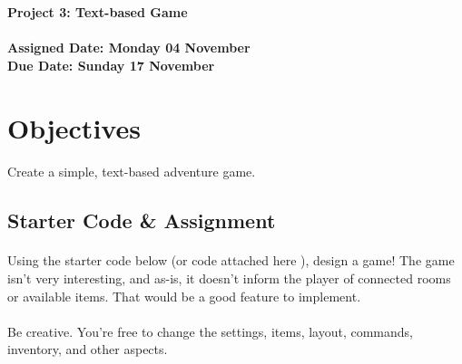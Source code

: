 \documentclass[letter,10pt]{article}
\begin{document}
    
    \huge
    \textbf{Project 3: Text-based Game}
    \normalsize
    \\ ~~ \\
    \textbf{Assigned Date: Monday 04 November} \\
    \textbf{Due Date: Sunday 17 November}
    
    \section*{Objectives}
    \paragraph{}Create a simple, text-based adventure game.
    
    \subsection*{Starter Code \& Assignment}
    \paragraph{}Using the starter code below (or code attached here ), design a game! The game isn't very interesting, and as-is, it doesn't inform the player of connected rooms or available items. That would be a good feature to implement.
    
    \paragraph{}Be creative. You're free to change the settings, items, layout, commands, inventory, and other aspects.
    
\end{document}
